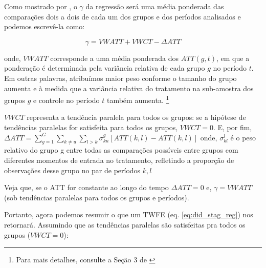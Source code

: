\documentclass[portugues]{article}
\begin{document}
Como mostrado por \cite{goodman2021difference}, o $\gamma$ da regressão será uma média ponderada das comparações dois a dois de cada um dos grupos e dos períodos analisados e podemos escrevê-la como:

\begin{equation}\label{eq:bacon_att}
    \gamma = VWATT + VWCT - \Delta ATT
\end{equation}

\noindent onde, $VWATT$ corresponde a uma média ponderada dos $ATT(g,t)$, em que a ponderação é determinada pela variância relativa de cada grupo $g$ no período $t$. Em outras palavras, atribuímos maior peso conforme o tamanho do grupo aumenta e à medida que a variância relativa do tratamento na sub-amostra dos grupos $g$ e controle no período $t$ também aumenta. \footnote{Para mais detalhes, consulte a Seção 3 de \cite{goodman2021difference}}

$VWCT$ representa a tendência paralela para todos os grupos: se a hipótese de tendências paralelas for satisfeita para todos os grupos, $VWCT=0$. E, por fim, $\Delta ATT = \sum_{g=1}^{G} \sum_{k \neq u} \sum_{l > k} \sigma_{ku}^{g} [ATT(k,l) - ATT(k, l)]$ onde, $\sigma_{kl}^{l}$ é o peso relativo do grupo g entre todas as comparações possíveis entre grupos com diferentes momentos de entrada no tratamento, refletindo a proporção de observações desse grupo no par de períodos $k,l$

Veja que, se o ATT for constante ao longo do tempo $\Delta ATT = 0$ e, $\gamma = VWATT$ (sob tendências paralelas para todos os grupos e períodos).  

Portanto, agora podemos resumir o que um TWFE (eq. \ref{eq:did_stag_reg}) nos retornará. Assumindo que as tendências paralelas são satisfeitas pra todos os grupos ($VWCT = 0$):
\end{document}

